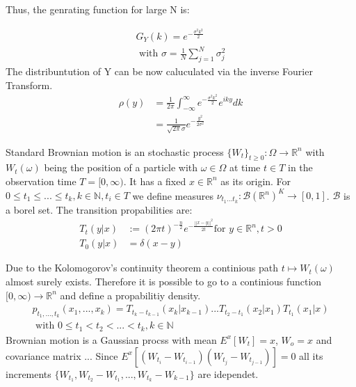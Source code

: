 \documentclass[
  a4paper,BCOR10mm,oneside,
  bibtotoc,idxtotoc,
  headsepline,footsepline,%
  fleqn,openbib
]{scrbook}
\begin{document}
Thus, the genrating function for large N is:

\begin{align}
 G_Y(k)=e^{- \frac{\sigma^2 k^2}{2}} \\ \nonumber
 \text{ with } \sigma =  \frac{1}{N} \sum_{j=1}^N \sigma_j^2 
\end{align}
The distribuntution of Y can be now caluculated via the inverse Fourier Transform.
\begin{align}
 \rho(y) &=\frac{1}{2 \pi} \int_{-\infty}^{\infty} e^{- \frac{\sigma^2 k^2}{2}} e^{i k y} dk \\  
 &=\frac{1}{\sqrt{2 \pi} \sigma } e^{-\frac{y^2}{2 \sigma^2}}
\end{align}

\begin{mydef}
Standard Brownian motion is an stochastic process $ \{ W_t \}_{t\geq0}: \Omega \rightarrow \mathbb{R}^n$ with $ W_t(\omega)$ being the position of a particle with $\omega \in \Omega$ at time $t \in T$ in the observation time $T =[0, \infty)$. It has a fixed $x \in \mathbb{R}^n$ as its origin. For $ 0 \leq t_1 \leq ... \leq t_k, k \in \mathbb{N}, t_i \in T $ we define measures $\nu_{t_{1}... t_{k}}: \mathcal{B}(\mathbb{R}^n)^K \rightarrow [0,1]$. $\mathcal{B}$ is a borel set. The transition propabilities are: 
\begin{align}
T_{t}(y|x) & := (2 \pi t)^{- \frac{n}{2}} e^{- \frac{||x-y||^2}{2 t}} \text{for } y \in \mathbb{R}^n, t>0 \\ \nonumber
T_{0}(y|x) & = \delta(x-y) 
\end{align}

\end{mydef}
Due to the Kolomogorov's continuity theorem a continious path $ t \mapsto W_t(\omega)$ almost surely exists. Therefore it is possible to go to a continious function $[0,\infty) \rightarrow \mathbb{R}^n$ and define a propabilitiy density.
\begin{align*}
p_{t_1,...,t_k}(x_1,...,x_k)  =T_{t_k -t_{k-1}}(x_k|x_{k-1}) ... T_{t_2 - t_1}(x_2|x_1) T_{t_1}(x_1|x)  \\
\text{ with }  0\leq t_1 < t_2 < ...< t_k,k \in \mathbb{N}
\end{align*}
\newline Brownian motion is a Gaussian procss with mean $E^x[W_t]=x$, $W_o=x$ and covariance matrix ...
Since $ E^x[(W_{t_i}-W_{t_{i-1}})(W_{t_j}-W_{t_{j-1}})]=0 $  all its increments $\{W_{t_1},W_{t_2}-W_{t_1},...,W_{t_k}-W_{k-1}\}$ are idependet. 
\end{document}
